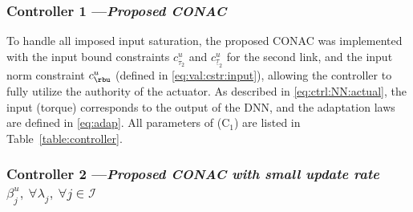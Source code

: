 \documentclass[letterpaper, journal, twoside]{IEEEtran}
\providecommand{\DIFadd}[1]{{\protect\color{blue}\uwave{#1}}} %
\providecommand{\DIFaddFL}[1]{\DIFadd{#1}} %
\providecommand{\DIFaddbeginFL}{} %
\providecommand{\DIFaddendFL}{} %
\providecommand{\DIFdelendFL}{} %
\begin{document}
\begin{table}[t]
\end{table}

\subsubsection*{Controller 1 —\textit{Proposed CONAC}}

To handle all imposed input saturation, the proposed CONAC was implemented with the input bound constraints $c^u_{\overline\tau_2}$ and $c^u_{\underline\tau_2}$ for the second link, and the input norm constraint $c^u_{\rbu}$ (defined in \eqref{eq:val:cstr:input}), allowing the controller to fully utilize the authority of the actuator.
As described in \eqref{eq:ctrl:NN:actual}, the input (torque) corresponds to the output of the DNN, and the adaptation laws are defined in \eqref{eq:adap}.
All parameters of (C$_1$) are listed in Table~\ref{table:controller}.

\subsubsection*{Controller 2 —\textit{Proposed CONAC with small update rate $\beta^u_j,\ \forall\lambda_j,\ \forall j\in\mathcal{I}$}}
\end{document}
